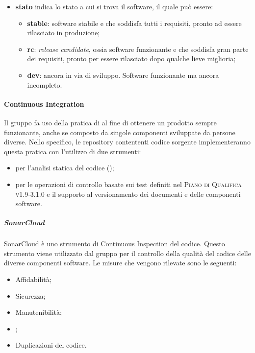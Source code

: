 \documentclass[../norme-di-progetto.tex]{subfiles}
\begin{document}
\begin{itemize}
\begin{itemize}
  \end{itemize}
  \item \textbf{stato} indica lo stato a cui si trova il software, il quale può essere:
  \begin{itemize}
    \item \textbf{stable}: software stabile e che soddisfa tutti i requisiti, pronto ad essere rilasciato in produzione;
    \item \textbf{rc}: \textit{release candidate}, ossia software funzionante e che soddisfa gran parte dei requisiti, pronto per essere rilasciato dopo qualche lieve miglioria;
    \item \textbf{dev}: ancora in via di sviluppo. Software funzionante ma ancora incompleto.
  \end{itemize}
\end{itemize}

\paragraph{Continuous Integration}
Il gruppo fa uso della pratica di  al fine di ottenere un prodotto sempre funzionante, anche se composto da singole componenti sviluppate da persone diverse. Nello specifico, le repository contententi codice sorgente implementeranno questa pratica con l'utilizzo di due strumenti:
\begin{itemize}
  \item \textbf{} per l'analisi statica del codice ();
  \item \textbf{} per le operazioni di controllo basate sui test definiti nel \textsc{Piano di Qualifica v1.9-3.1.0} e il supporto al versionamento dei documenti e delle componenti software.
\end{itemize}
\subparagraph{SonarCloud}
SonarCloud è uno strumento di Continuous Inspection del codice. Questo strumento viene utilizzato dal gruppo per il controllo della qualità del codice delle diverse componenti software. Le misure che vengono rilevate sono le seguenti:
\begin{itemize}
  \item Affidabilità;
  \item Sicurezza;
  \item Manutenibilità;
  \item {};
  \item Duplicazioni del codice.
\end{itemize}
\end{document}
